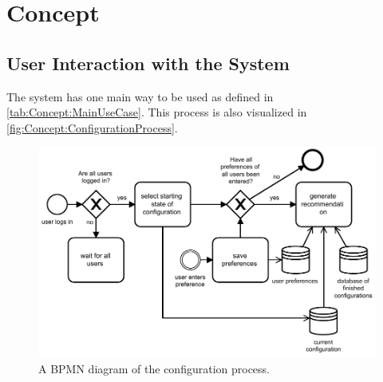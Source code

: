 \chapter{Concept}
\label{ch:Concept}

\section{User Interaction with the System}
\label{sec:Concept:UserSystemInteraction}

The system has one main way to be used as defined in \autoref{tab:Concept:MainUseCase}. This process is also visualized in \autoref{fig:Concept:ConfigurationProcess}.

\begin{figure}
    \centering
    \includegraphics[width=1\textwidth]{./figures/bpmn_configuration_process_with_continious_recommendation.pdf}
    \caption{A BPMN diagram of the configuration process.}
    \label{fig:Concept:ConfigurationProcess}
\end{figure}

